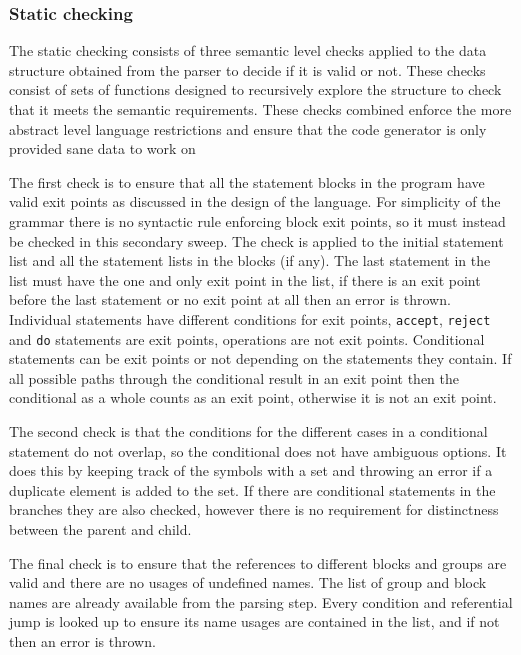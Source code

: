 \documentclass[11pt]{article}
\begin{document}
\subsubsection{Static checking}

The static checking consists of three semantic level checks applied to the data structure obtained from the parser to decide if it is valid or not. These checks consist of sets of functions designed to recursively explore the structure to check that it meets the semantic requirements. These checks combined enforce the more abstract level language restrictions and ensure that the code generator is only provided sane data to work on 

The first check is to ensure that all the statement blocks in the program have valid exit points as discussed in the design of the language. For simplicity of the grammar there is no syntactic rule enforcing block exit points, so it must instead be checked in this secondary sweep. The check is applied to the initial statement list and all the statement lists in the blocks (if any). The last statement in the list must have the one and only exit point in the list, if there is an exit point before the last statement or no exit point at all then an error is thrown. Individual statements have different conditions for exit points, \texttt{accept}, \texttt{reject} and \texttt{do} statements are exit points, operations are not exit points. Conditional statements can be exit points or not depending on the statements they contain. If all possible paths through the conditional result in an exit point then the conditional as a whole counts as an exit point, otherwise it is not an exit point.

The second check is that the conditions for the different cases in a conditional statement do not overlap, so the conditional does not have ambiguous options. It does this by keeping track of the symbols with a set and throwing an error if a duplicate element is added to the set. If there are conditional statements in the branches they are also checked, however there is no requirement for distinctness between the parent and child.

The final check is to ensure that the references to different blocks and groups are valid and there are no usages of undefined names. The list of group and block names are already available from the parsing step. Every condition and referential jump is looked up to ensure its name usages are contained in the list, and if not then an error is thrown.
\end{document}
